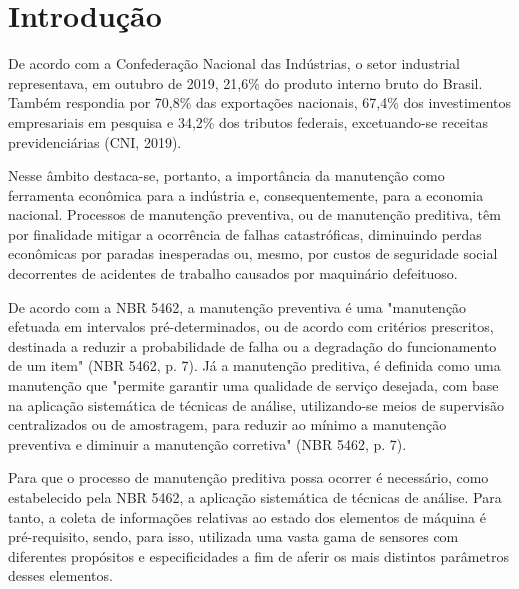 \documentclass[
	12pt,				
	oneside,			
	a4paper,			
	english,			
	brazil,			
	]{abntex2ppgsi}
\begin{document}
\tableofcontents*
\cleardoublepage


\textual




\chapter{Introdução}
De acordo com a Confederação Nacional das Indústrias, o setor industrial representava, em outubro de 2019, 21,6\% do produto interno bruto do Brasil. Também respondia por 70,8\% das exportações nacionais, 67,4\% dos investimentos empresariais em pesquisa  e 34,2\% dos tributos federais, excetuando-se receitas previdenciárias (CNI, 2019). 

Nesse âmbito destaca-se, portanto, a importância da manutenção como ferramenta econômica para a indústria e, consequentemente, para a economia nacional. Processos de manutenção preventiva, ou de manutenção preditiva, têm por finalidade mitigar a ocorrência de falhas catastróficas, diminuindo perdas econômicas por paradas inesperadas ou, mesmo, por custos de seguridade social decorrentes de acidentes de trabalho causados por maquinário defeituoso.

De acordo com a NBR 5462, a manutenção preventiva é uma "manutenção efetuada em intervalos pré-determinados, ou de acordo com critérios prescritos, destinada a reduzir a probabilidade de falha ou a degradação do funcionamento de um item" (NBR 5462, p. 7). Já a manutenção preditiva, é definida como uma manutenção que "permite garantir uma qualidade de serviço desejada, com base na aplicação sistemática de técnicas de análise, utilizando-se meios de supervisão centralizados ou de amostragem, para reduzir ao mínimo a manutenção preventiva e diminuir a manutenção corretiva" (NBR 5462, p. 7). 

Para que o processo de manutenção preditiva possa ocorrer é necessário, como estabelecido pela NBR 5462, a aplicação sistemática de técnicas de análise. Para tanto, a coleta de informações relativas ao estado dos elementos de máquina é pré-requisito, sendo, para isso, utilizada uma vasta gama de sensores com diferentes propósitos e especificidades a fim de aferir os mais distintos parâmetros desses elementos. 
\end{document}
